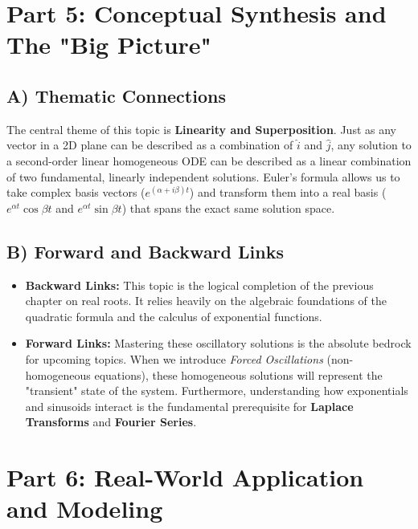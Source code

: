 \documentclass[11pt]{article}
\begin{document}
\newpage
\section{Part 5: Conceptual Synthesis and The "Big Picture"}

\subsection{A) Thematic Connections}
The central theme of this topic is \textbf{Linearity and Superposition}. Just as any vector in a 2D plane can be described as a combination of $\hat{i}$ and $\hat{j}$, any solution to a second-order linear homogeneous ODE can be described as a linear combination of two fundamental, linearly independent solutions. Euler's formula allows us to take complex basis vectors ($e^{(\alpha + i\beta)t}$) and transform them into a real basis ($e^{\alpha t}\cos \beta t$ and $e^{\alpha t}\sin \beta t$) that spans the exact same solution space.

\subsection{B) Forward and Backward Links}
\begin{itemize}
    \item \textbf{Backward Links:} This topic is the logical completion of the previous chapter on real roots. It relies heavily on the algebraic foundations of the quadratic formula and the calculus of exponential functions.
    \item \textbf{Forward Links:} Mastering these oscillatory solutions is the absolute bedrock for upcoming topics. When we introduce \textit{Forced Oscillations} (non-homogeneous equations), these homogeneous solutions will represent the "transient" state of the system. Furthermore, understanding how exponentials and sinusoids interact is the fundamental prerequisite for \textbf{Laplace Transforms} and \textbf{Fourier Series}.
\end{itemize}

\section{Part 6: Real-World Application and Modeling}
\end{document}
